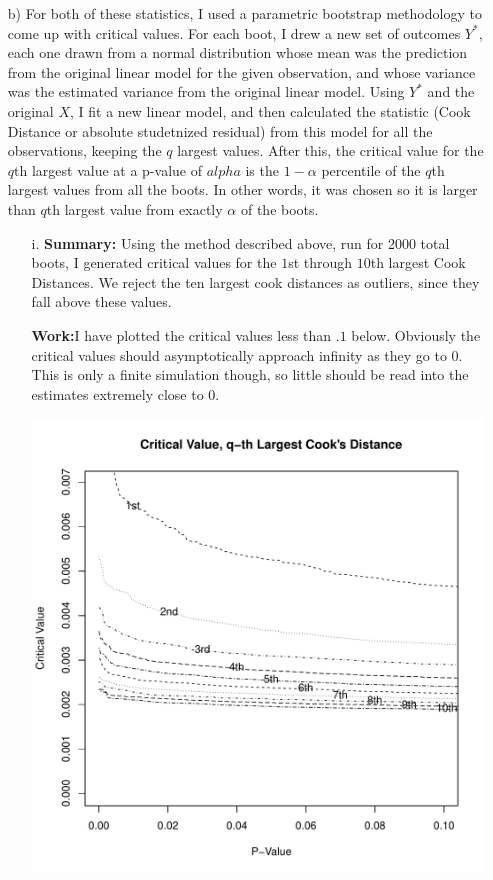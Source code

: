 \documentclass[11pt]{article}
\theoremstyle{definition}
\begin{document}
\begin{itemize}
\begin{itemize}
\begin{itemize}
                \end{itemize}
            \item[b)]
                For both of these statistics, I used a parametric bootstrap methodology to come up with critical values. For each boot, I drew a new set of outcomes $Y^*$, each one drawn from a normal distribution whose mean was the prediction from the original linear model for the given observation, and whose variance was the estimated variance from the original linear model. Using $Y^*$ and the original $X$, I fit a new linear model, and then calculated the statistic (Cook Distance or absolute studetnized residual) from this model for all the observations, keeping the $q$ largest values. After this, the critical value for the $q$th largest value at a p-value of $alpha$ is the $1-\alpha$ percentile of the $q$th largest values from all the boots. In other words, it was chosen so it is larger than $q$th largest value from exactly $\alpha$ of the boots. 
                \begin{itemize}
                    \item[i.]
                        {\bf Summary:} Using the method described above, run for 2000 total boots, I generated critical values for the $1$st through $10$th largest Cook Distances. We reject the ten largest cook distances as outliers, since they fall above these values. \par
                        {\bf Work:}I have plotted the critical values less than $.1$ below. Obviously the critical values should asymptotically approach infinity as they go to $0$. This is only a finite simulation though, so little should be read into the estimates extremely close to $0$.
                        \begin{center}
                            \includegraphics[width=12cm]{final/2bi_plot} 

\end{center}
\end{itemize}
\end{itemize}
\end{itemize}
\end{document}
